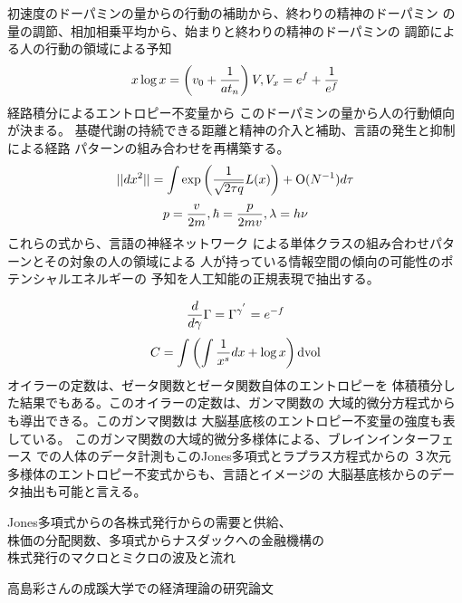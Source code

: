 \documentclass{jsarticle}
\begin{document}
{      初速度のドーパミンの量からの行動の補助から、終わりの精神のドーパミン
  の量の調節、相加相乗平均から、始まりと終わりの精神のドーパミンの
  調節による人の行動の領域による予知
  $$ x \log x = \left(v_0 + {1 \over at_n}\right)V, V_x = e^f + {1 \over e^f} $$
     経路積分によるエントロピー不変量から
  このドーパミンの量から人の行動傾向が決まる。
  基礎代謝の持続できる距離と精神の介入と補助、言語の発生と抑制による経路
  パターンの組み合わせを再構築する。
  $$ ||dx^2|| = \int {\mathrm{exp}\left({1 \over \sqrt{2 \tau q}}L(x)
  \right) + \mathrm{O}(N^{-1})}d \tau   $$
  $$ p = {v \over 2m}, \hbar = {p \over 2mv}, \lambda = h \nu $$
     これらの式から、言語の神経ネットワーク
  による単体クラスの組み合わせパターンとその対象の人の領域による
  人が持っている情報空間の傾向の可能性のポテンシャルエネルギーの
  予知を人工知能の正規表現で抽出する。
   
  $$ {d \over d \gamma}\Gamma = \Gamma^{{\gamma}^{'}} = e^{-f}  $$
  $$ C = \int \left(\int {1 \over x^s}dx + \log x \right)\mathrm{dvol} $$
  オイラーの定数は、ゼータ関数とゼータ関数自体のエントロピーを
  体積積分した結果でもある。このオイラーの定数は、ガンマ関数の
  大域的微分方程式からも導出できる。このガンマ関数は
  大脳基底核のエントロピー不変量の強度も表している。
  このガンマ関数の大域的微分多様体による、ブレインインターフェース
  での人体のデータ計測もこのJones多項式とラプラス方程式からの
  ３次元多様体のエントロピー不変式からも、言語とイメージの
  大脳基底核からのデータ抽出も可能と言える。


\newpage
\begin{center}
\large	Jones多項式からの各株式発行からの需要と供給、\\
株価の分配関数、多項式からナスダックへの金融機構の \\
株式発行のマクロとミクロの波及と流れ
\end{center}
\begin{center}
	高島彩さんの成蹊大学での経済理論の研究論文
\end{center}

}
\end{document}

